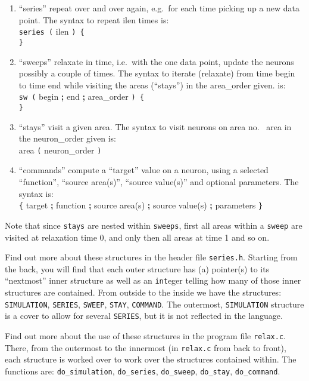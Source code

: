 \documentclass[12pt]{article}
\begin{document}
\begin{enumerate}
\item ``series'' repeat over and over again, e.g.\ for each time picking up a new data point.
      The syntax to repeat {\color{blue} ilen} times is:\\[6pt]
      \texttt{series (} {\color{blue} ilen} \texttt{) \{} \\
      \texttt{\}}

\item ``sweeps'' relaxate in time, i.e.\ with the one data point, update the neurons possibly a couple of times.
      The syntax to iterate (relaxate) from time {\color{blue} begin} to time {\color{blue} end} while visiting the areas (``stays'') in the {\color{blue} area\_order} given. is:\\[6pt]
      \texttt{sw (} {\color{blue} begin} {\bf ;} {\color{blue} end} {\bf ;} {\color{blue} area\_order} \texttt{) \{} \\
      \texttt{\}}

\item ``stays'' visit a given area. The syntax to visit neurons on area no.\ {\color{blue} area} in the {\color{blue} neuron\_order} given is:\\[6pt]
      {\color{blue} area} \texttt{(} {\color{blue} neuron\_order} \texttt{)}

\item ``commands'' compute a ``target'' value on a neuron, using a selected ``function'', ``source area(s)'', ``source value(s)'' and optional parameters.
      The syntax is:\\[6pt]
      \texttt{\{} {\color{blue} target} {\bf ;} {\color{blue} function} {\bf ;} {\color{blue} source area(s)} {\bf ;}
      {\color{blue} source value(s)} {\bf ;} {\color{blue} parameters} \texttt{\}}
\end{enumerate}

Note that since \texttt{stays} are nested within \texttt{sweeps},
first all areas within a \texttt{sweep} are visited at relaxation time 0, and only then all areas at time 1 and so on.

{\footnotesize
Find out more about these structures in the header file \texttt{series.h}.
Starting from the back, you will find that each outer structure has (a) pointer(s) to its ``nextmost'' inner structure
as well as an \texttt{int}eger telling how many of those inner structures are contained.
From outside to the inside we have the structures:
\texttt{SIMULATION}, \texttt{SERIES}, \texttt{SWEEP}, \texttt{STAY}, \texttt{COMMAND}.
The outermost, \texttt{SIMULATION} structure is a cover to allow for several \texttt{SERIES}, but it is not reflected in the language.

Find out more about the use of these structures in the program file \texttt{relax.c}.
There, from the outermost to the innermost (in \texttt{relax.c} from back to front),
each structure is worked over to work over the structures contained within.
The functions are: \texttt{do\_simulation}, \texttt{do\_series}, \texttt{do\_sweep}, \texttt{do\_stay}, \texttt{do\_command}.
}
\end{document}
